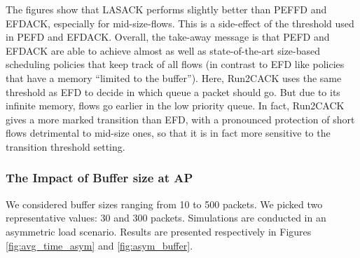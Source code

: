 \documentclass[preprint,12pt]{elsarticle}
\begin{document}
The figures show that LASACK performs slightly better than PEFFD and EFDACK, especially for mid-size-flows. This is a side-effect of the threshold used in PEFD and EFDACK.  Overall, the take-away message is that PEFD and EFDACK are able to achieve almost as well as state-of-the-art size-based scheduling policies that keep track of all flows (in contrast to EFD like policies that have a memory ``limited to the buffer''). 
Here, Run2CACK uses the same threshold as EFD to decide in which queue a packet should go. But due to its infinite memory, flows go earlier in the low priority queue. In fact, Run2CACK  gives a more marked transition than EFD, with a pronounced protection of short flows detrimental to mid-size ones, so that it is in fact more sensitive to the transition threshold setting.


\subsubsection{The Impact of Buffer size at AP}

We considered buffer sizes ranging from 10 to 500 packets. We picked two representative values: 30 and 300 packets.  Simulations are conducted in an asymmetric load scenario. Results are presented respectively  in Figures \ref{fig:avg_time_asym} and  \ref{fig:asym_buffer}. 

%
\end{document}
